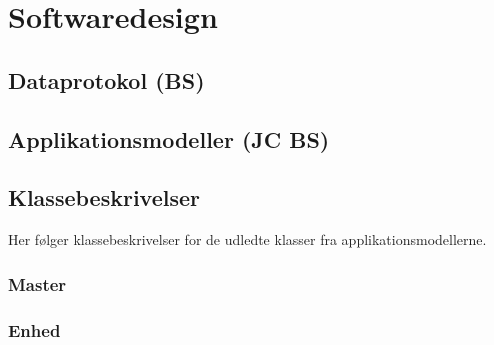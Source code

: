 \chapter{Softwaredesign}

\section{Dataprotokol (BS)}


\section{Applikationsmodeller (JC BS)}


\section{Klassebeskrivelser}
Her følger klassebeskrivelser for de udledte klasser fra applikationsmodellerne.

\subsection{Master}






\subsection{Enhed}





